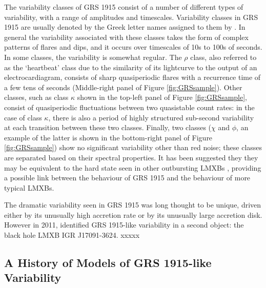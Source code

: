 \par The variability classes of GRS 1915 consist of a number of different types of variability, with a range of amplitudes and timescales.  Variability classes in GRS 1915 are usually denoted by the Greek letter names assigned to them by \citet{Belloni_GRS_MI}.  In general the variability associated with these classes takes the form of complex patterns of flares and dips, and it occurs over timescales of 10s to 100s of seconds.  In some classes, the variability is somewhat regular.  The $\rho$ class, also referred to as the `heartbeat' class due to the similarity of its lightcurve to the output of an electrocardiagram, consists of sharp quasiperiodic flares with a recurrence time of a few tens of seconds (Middle-right panel of Figure \ref{fig:GRSsample}).  Other classes, such as class $\kappa$ shown in the top-left panel of Figure \ref{fig:GRSsample}, consist of quasiperiodic fluctuations between two quasistable count rates: in the case of class $\kappa$, there is also a period of highly structured sub-second variability at each transition between these two classes.  Finally, two classes ($\chi$ and $\phi$, an example of the latter is shown in the bottom-right panel of Figure \ref{fig:GRSsample}) show no significant variability other than red noise; these classes are separated based on their spectral properties.  It has been suggested they they may be equivalent to the hard state seen in other outbursting LMXBs \citep{VanOers_GRSHard}, providing a possible link between the behaviour of GRS 1915 and the behaviour of more typical LMXBs.
\par The dramatic variability seen in GRS 1915 was long thought to be unique, driven either by its unusually high accretion rate or by its unusually large accretion disk.  However in 2011, \citet{Altamirano_IGR_FH} identified GRS 1915-like variability in a second object: the black hole LMXB IGR J17091-3624. xxxxx



\subsection{A History of Models of GRS 1915-like Variability}

